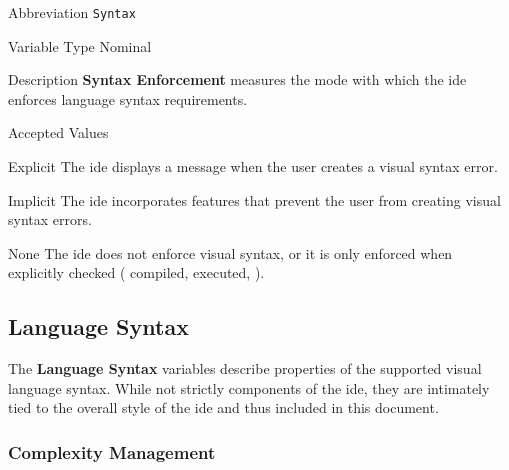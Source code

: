 \begin{AlignedDesc}
  \item[Abbreviation] \texttt{Syntax}

  \item[Variable Type] Nominal

  \item[Description] \textbf{Syntax Enforcement} measures the mode with
  which the \ac{ide} enforces language syntax requirements.

  \item[Accepted Values]

  \begin{AlignedDesc}
    \item[Explicit] The \ac{ide} displays a message when the user creates a
    visual syntax error.
    \item[Implicit] The \ac{ide} incorporates features that prevent the
    user from creating visual syntax errors.
    \item[None] The \ac{ide} does not enforce visual syntax, or it is only
    enforced when explicitly checked (\eg{} compiled, executed, \etc).
  \end{AlignedDesc}

\end{AlignedDesc}


\subsection{Language Syntax}
\label{subsec:languagesyntax}

The \textbf{Language Syntax} variables describe properties of the supported
visual language syntax. While not strictly components of the \ac{ide}, they
are intimately tied to the overall style of the \ac{ide} and thus
included in this document.

\subsubsection{Complexity Management}
\label{subsubsec:complexity}

